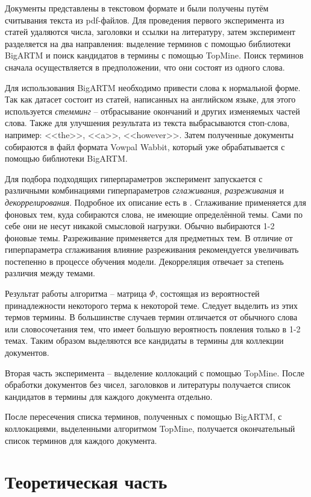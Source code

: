 \documentclass[a4paper, 12pt]{article}
\begin{document}
    Документы представлены в текстовом формате и были получены путём считывания текста из pdf-файлов. Для проведения первого эксперимента из статей удаляются числа, заголовки и ссылки на литературу, затем эксперимент разделяется на два направления: выделение терминов с помощью библиотеки BigARTM и поиск кандидатов в термины с помощью TopMine. Поиск терминов сначала осуществляется в предположении, что они состоят из одного слова.

    Для использования BigARTM необходимо привести слова к нормальной форме. Так как датасет состоит из статей, написанных на английском языке, для этого используется \textit{стемминг} -- отбрасывание окончаний и других изменяемых частей слова. Также для улучшения результата из текста выбрасываются стоп-слова, например: <<the>>, <<a>>, <<however>>. Затем полученные документы собираются в файл формата Vowpal Wabbit, который уже обрабатывается с помощью библиотеки BigARTM.
    
    Для подбора подходящих гиперпараметров эксперимент запускается с различными комбинациями гиперпараметров \textit{сглаживания}, \textit{разреживания} и \textit{декоррелирования}. Подробное их описание есть в \citep{Vorontsov2014}. Сглаживание применяется для фоновых тем, куда собираются слова, не имеющие определённой темы. Сами по себе они не несут никакой смысловой нагрузки. Обычно выбираются 1-2 фоновые темы. Разреживание применяется для предметных тем. В отличие от гиперпараметра сглаживания влияние разреживания рекомендуется увеличивать постепенно в процессе обучения модели. Декорреляция отвечает за степень различия между темами.

    Результат работы алгоритма -- матрица $\Phi$, состоящая из вероятностей принадлежности некоторого терма к некоторой теме. Следует выделить из этих термов термины. В большинстве случаев термин отличается от обычного слова или словосочетания тем, что имеет большую вероятность пояления только в 1-2 темах. Таким образом выделяются все кандидаты в термины для коллекции документов.

    Вторая часть эксперимента -- выделение коллокаций с помощью TopMine. После обработки документов без чисел, заголовков и литературы получается список кандидатов в термины для каждого документа отдельно.

    После пересечения списка терминов, полученных с помощью BigARTM, с коллокациями, выделенными алгоритмом TopMine, получается окончательный список терминов для каждого документа.

\section{Теоретическая часть}
\end{document}
